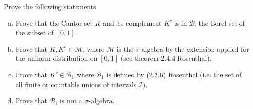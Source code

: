\begin{problem}
	Prove the following statements. 
	\begin{enumerate}[(a)]
		\item Prove that the Cantor set $ K $ and its complement $ K^c $ is in $ \mathcal{B} $, the Borel set of the subset of $ [0,1] $.
		\item Prove that $ K,K^c \in \mathcal{M} $, where $ \mathcal{M} $ is the $ \sigma\text{-algebra} $ by the extension applied for the uniform distribution on $ [0,1] $ (see theorem 2.4.4 Rosenthal).
		\item Prove that $ K^c \in \mathcal{B}_1 $ where $ \mathcal{B}_1 $ is defined by (2.2.6) Rosenthal (i.e. the set of all finite or countable unions of intervals $ \mathcal{I} $).
		\item Prove that $ \mathcal{B}_1 $ is not a $ \sigma\text{-algebra} $.
		
	\end{enumerate}
\end{problem}

